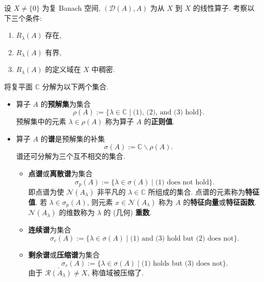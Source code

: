 \begin{Definition}
\label{def:resolvent-spectrum-and-spectral-parts}
设 $X\ne\{0\}$ 为复 Banach 空间, $(\mathcal{D}(A),A)$ 为从 $X$ 到 $X$ 的线性算子. 考察以下三个条件:\begin{enumerate}\item $R_\lambda(A)$ 存在,\item $R_\lambda(A)$ 有界,\item $R_\lambda(A)$ 的定义域在 $X$ 中稠密.\end{enumerate}将复平面 $\mathbb{C}$ 分解为以下两个集合.\begin{itemize}\item 算子 $A$ 的\textbf{预解集}为集合
\begin{equation}\label{eq:resolvent-set-definition}
\rho(A):=\{\lambda\in\mathbb{C}\mid\text{(1), (2), and (3) hold}\}.
\end{equation}
预解集中的元素 $\lambda\in\rho(A)$ 称为算子 $A$ 的\textbf{正则值}.\item 算子 $A$ 的\textbf{谱}是预解集的补集
\begin{equation}\label{eq:operator-spectrum-definition}
\sigma(A):=\mathbb{C}\backslash\rho(A).
\end{equation}
谱还可分解为三个互不相交的集合.\begin{itemize}\item \textbf{点谱}或\textbf{离散谱}为集合
\begin{equation}\label{eq:operator-point-spectrum-definition}
\sigma_p(A):=\{\lambda\in\sigma(A)\mid\text{(1) does not hold}\}.
\end{equation}
即点谱为使 $\mathcal{N}(A_\lambda)$ 非平凡的 $\lambda\in\mathbb{C}$ 所组成的集合. 点谱的元素称为\textbf{特征值}. 若 $\lambda\in\sigma_p(A)$, 则元素 $x\in\mathcal{N}(A_\lambda)$ 称为 $A$ 的\textbf{特征向量}或\textbf{特征函数}. $\mathcal{N}(A_\lambda)$ 的维数称为 $\lambda$ 的 (几何) \textbf{重数}.\item \textbf{连续谱}为集合
\begin{equation}\label{eq:operator-continuous-spectrum-definition}
\sigma_c(A):=\{\lambda\in\sigma(A)\mid\text{(1) and (3) hold but (2) does not}\}.
\end{equation}
\item \textbf{剩余谱}或\textbf{压缩谱}为集合
\begin{equation}\label{eq:operator-residual-spectrum-definition}
\sigma_r(A):=\{\lambda\in\sigma(A)\mid\text{(1) holds but (3) does not}\}.
\end{equation}
由于 $\overline{\mathcal{R}(A_\lambda)}\ne X$, 称值域被压缩了.\end{itemize}\end{itemize}
\end{Definition}

